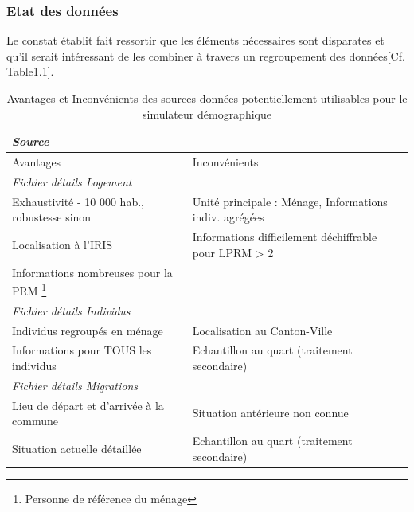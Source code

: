 \documentclass{bredele}
\begin{document}
\subsubsection{Etat des données}
Le constat établit fait ressortir que les éléments nécessaires sont disparates et qu'il serait intéressant de les combiner à travers un regroupement des données[Cf. Table1.1].\\
\renewcommand{\arraystretch}{1.5}
\begin{table}
\begin{tabular}{|p{7.5cm}|p{7.5cm}|}
 \hline 
	\multicolumn{2}{|l|}{\Large{\textit{Source}}} \\
	\hline \large{Avantages} & \large{Inconvénients}\\

	\hline \multicolumn{2}{|l|}{\Large{\textit{Fichier détails Logement}}}\\
	\hline Exhaustivité - 10 000 hab., robustesse sinon & Unité principale : Ménage, Informations indiv. agrégées \\
	Localisation à l'IRIS & Informations difficilement déchiffrable pour LPRM > 2 \\
  Informations nombreuses pour la PRM \footnote{Personne de référence du ménage} & \\
	
	\hline \multicolumn{2}{|l|}{\Large{\textit{Fichier détails Individus}}}\\
	\hline Individus regroupés en ménage & Localisation au Canton-Ville\\
  Informations pour TOUS les individus & Echantillon au quart (traitement secondaire)\\
	
	\hline \multicolumn{2}{|l|}{\Large{\textit{Fichier détails Migrations}}}\\
	\hline Lieu de départ et d'arrivée à la commune & Situation antérieure non connue\\
  Situation actuelle détaillée & Echantillon au quart (traitement secondaire)\\
\hline
 \end{tabular}
	\caption{Avantages et Inconvénients des sources données potentiellement utilisables pour le simulateur démographique}
\end{table}
\end{document}

